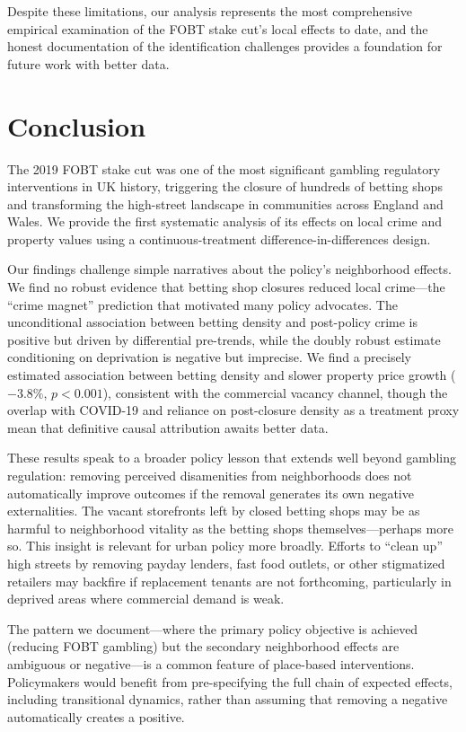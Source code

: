 \documentclass[12pt]{article}
\begin{document}
Despite these limitations, our analysis represents the most comprehensive empirical examination of the FOBT stake cut's local effects to date, and the honest documentation of the identification challenges provides a foundation for future work with better data.


\section{Conclusion}
\label{sec:conclusion}

The 2019 FOBT stake cut was one of the most significant gambling regulatory interventions in UK history, triggering the closure of hundreds of betting shops and transforming the high-street landscape in communities across England and Wales. We provide the first systematic analysis of its effects on local crime and property values using a continuous-treatment difference-in-differences design.

Our findings challenge simple narratives about the policy's neighborhood effects. We find no robust evidence that betting shop closures reduced local crime---the ``crime magnet'' prediction that motivated many policy advocates. The unconditional association between betting density and post-policy crime is positive but driven by differential pre-trends, while the doubly robust estimate conditioning on deprivation is negative but imprecise. We find a precisely estimated association between betting density and slower property price growth ($-3.8\%$, $p < 0.001$), consistent with the commercial vacancy channel, though the overlap with COVID-19 and reliance on post-closure density as a treatment proxy mean that definitive causal attribution awaits better data.

These results speak to a broader policy lesson that extends well beyond gambling regulation: removing perceived disamenities from neighborhoods does not automatically improve outcomes if the removal generates its own negative externalities. The vacant storefronts left by closed betting shops may be as harmful to neighborhood vitality as the betting shops themselves---perhaps more so. This insight is relevant for urban policy more broadly. Efforts to ``clean up'' high streets by removing payday lenders, fast food outlets, or other stigmatized retailers may backfire if replacement tenants are not forthcoming, particularly in deprived areas where commercial demand is weak.

The pattern we document---where the primary policy objective is achieved (reducing FOBT gambling) but the secondary neighborhood effects are ambiguous or negative---is a common feature of place-based interventions. Policymakers would benefit from pre-specifying the full chain of expected effects, including transitional dynamics, rather than assuming that removing a negative automatically creates a positive.
\end{document}
